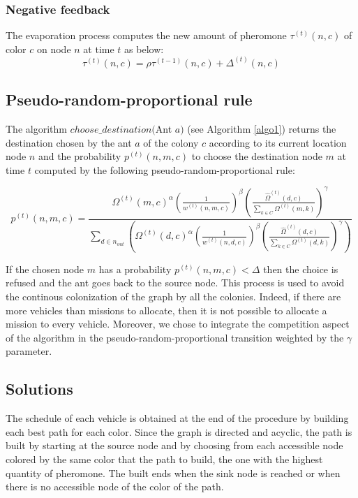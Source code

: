 \documentclass[a4paper,10pt]{article}
\begin{document}
\subsubsection{Negative feedback}
The evaporation process computes the new amount of pheromone $\tau^{(t)}(n,c)$ of color $c$ on node $n$ at time $t$ as below:
\begin{equation*}
 \tau^{(t)}(n,c) = \rho \tau^{(t-1)}(n,c) + \Delta^{(t)}(n,c)
\end{equation*}

\subsection{Pseudo-random-proportional rule}
The algorithm $choose\_destination($Ant $a)$ (see Algorithm \ref{algo1}) returns the destination chosen by the ant $a$ of the colony $c$ according to its current location node $n$ and the probability $p^{(t)}(n,m,c)$ to choose the destination node $m$ at time $t$ computed by the following pseudo-random-proportional rule:

\begin{equation*}
  p^{(t)}(n,m,c) = \frac
    {
      \Omega^{(t)}(m,c)^{\alpha}
      \left( \frac{1}{w^{(t)}(n,m,c)} \right) ^{\beta}
      \left( \frac{\hat \Omega^{(t)}(d,c)}{\sum_{k \in C} \Omega^{(t)}(m,k)} \right)^{\gamma}
    }
    {
      \sum_{d \in n_{out}} \left(
	\Omega^{(t)}(d,c)^{\alpha}
	\left( \frac{1}{w^{(t)}(n,d,c)} \right)^{\beta}
	\left( \frac{\hat \Omega^{(t)}(d,c)}{\sum_{k \in C} \Omega^{(t)}(d,k)} \right)^{\gamma}
      \right)
    }
\end{equation*}

If the chosen node $m$ has a probability $p^{(t)}(n,m,c) < \Delta$ then the choice is refused and the ant goes back to the source node. This process is used to avoid the continous colonization of the graph by all the colonies. Indeed, if there are more vehicles than missions to allocate, then it is not possible to allocate a mission to every vehicle. Moreover, we chose to integrate the competition aspect of the algorithm in the pseudo-random-proportional transition weighted by the $\gamma$ parameter.

\subsection{Solutions}
The schedule of each vehicle is obtained at the end of the procedure by building each best path for each color. Since the graph is directed and acyclic, the path is built by starting at the source node and by choosing from each accessible node colored by the same color that the path to build, the one with the highest quantity of pheromone. The built ends when the sink node is reached or when there is no accessible node of the color of the path.
\end{document}
